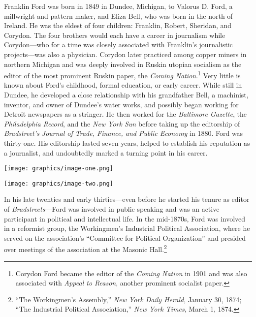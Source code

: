 \documentclass[twoside,symmetric,nobib,justified]{tufte-book}
\begin{document}
Franklin Ford was born in 1849 in Dundee, Michigan, to Valorus D. Ford,
a millwright and pattern maker, and Eliza Bell, who was born in the
north of Ireland. He was the eldest of four children: Franklin, Robert,
Sheridan, and Corydon. The four brothers would each have a career in
journalism while Corydon---who for a time was closely associated with
Franklin's journalistic projects---was also a physician. Corydon later
practiced among copper miners in northern Michigan and was deeply
involved in Ruskin utopian socialism as the editor of the most prominent
Ruskin paper, the \emph{Coming Nation}.\footnote{Corydon Ford became the
  editor of the \emph{Coming Nation} in 1901 and was also associated
  with \emph{Appeal to Reason}, another prominent socialist paper.} Very
little is known about Ford's childhood, formal education, or early
career. While still in Dundee, he developed a close relationship with
his grandfather Bell, a machinist, inventor, and owner of Dundee's water
works, and possibly began working for Detroit newspapers as a stringer.
He then worked for the \emph{Baltimore Gazette}, the \emph{Philadelphia
Record}, and the \emph{New York Sun} before taking up the editorship of
\emph{Bradstreet's Journal of Trade, Finance, and Public Economy} in
1880. Ford was thirty-one. His editorship lasted seven years, helped to
establish his reputation as a journalist, and undoubtedly marked a
turning point in his career.

\begin{figure*}
   \texttt{[image: graphics/image-one.png]}
   \label{fig:fig1}
\end{figure*}

\begin{figure*}
   \texttt{[image: graphics/image-two.png]}
   \label{fig:fig2}
\end{figure*}

In his late twenties and early thirties---even before he started his
tenure as editor of \emph{Bradstreet\textquotesingle s}---Ford was
involved in public speaking and was an active participant in political
and intellectual life. In the mid-1870s, Ford was involved in a
reformist group, the Workingmen's Industrial Political Association,
where he served on the association's ``Committee for Political
Organization'' and presided over meetings of the association at the
Masonic Hall.\footnote{``The Workingmen's Assembly,'' \emph{New York
  Daily Herald}, January 30, 1874; ``The Industrial Political
  Association,'' \emph{New York Times}, March 1, 1874.}
\end{document}

